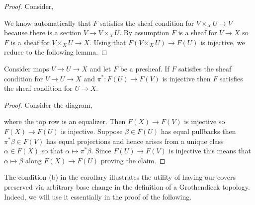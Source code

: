 \documentclass[12pt]{article}
\begin{document}
\begin{proof}
Consider,
\begin{center}
\end{center}
We know automatically that $F$ satisfies the sheaf condition for $V \times_X U \to V$ because there is a section $V \to V \times_X U$. By assumption $F$ is a sheaf for $V \to X$ so $F$ is a sheaf for $V \times_X U \to X$. Using that $F(V \times_X U) \to F(U)$ is injective, we reduce to the following lemma. 
\end{proof}

\begin{lemma}
Consider maps $V \to U \to X$ and let $F$ be a presheaf. If $F$ satisfies the sheaf condition for $V \to U \to X$ and $\pi^* : F(U) \to F(V)$ is injective then $F$ satisfies the sheaf condition for $U \to X$.
\end{lemma}

\begin{proof}
Consider the diagram,
\begin{center}
\end{center}
where the top row is an equalizer. Then $F(X) \to F(V)$ is injective so $F(X) \to F(U)$ is injective. Suppose $\beta \in F(U)$ has equal pullbacks then $\pi^* \beta \in F(V)$ has equal projections and hence arises from a unique class $\alpha \in F(X)$ so that $\alpha \mapsto \pi^* \beta$. Since $F(U) \to F(V)$ is injective this means that $\alpha \mapsto \beta$ along $F(X) \to F(U)$ proving the claim.
\end{proof}

\begin{rmk}
The condition (b) in the corollary illustrates the utility of having our covers preserved via arbitrary base change in the definition of a Grothendieck topology. Indeed, we will use it essentially in the proof of the following.
\end{rmk}
\end{document}
